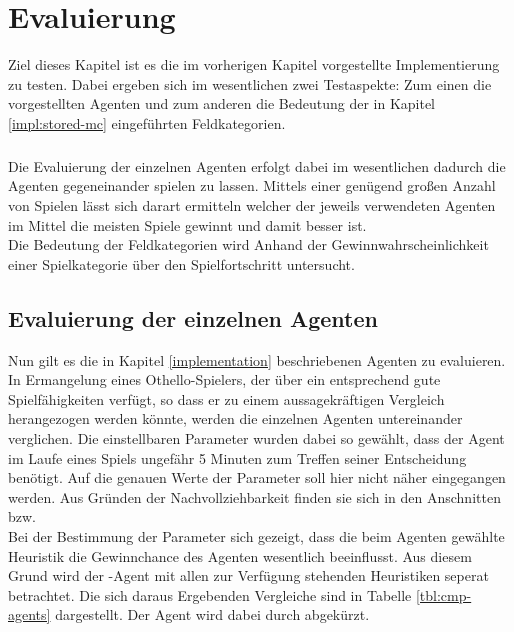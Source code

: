 \chapter{Evaluierung}
Ziel dieses Kapitel ist es die im vorherigen Kapitel vorgestellte Implementierung zu testen. Dabei ergeben sich im wesentlichen zwei Testaspekte: Zum einen die vorgestellten Agenten und zum anderen die Bedeutung der in Kapitel \ref{impl:stored-mc} eingeführten Feldkategorien.
\paragraph{}
Die Evaluierung der einzelnen Agenten erfolgt dabei im wesentlichen dadurch die Agenten gegeneinander spielen zu lassen. Mittels einer genügend großen Anzahl von Spielen lässt sich darart ermitteln welcher der jeweils verwendeten Agenten im Mittel die meisten Spiele gewinnt und damit besser ist.
\\Die Bedeutung der Feldkategorien wird Anhand der Gewinnwahrscheinlichkeit einer Spielkategorie über den Spielfortschritt untersucht.
\section{Evaluierung der einzelnen Agenten}
\label{cpt:eval-agents}
Nun gilt es die in Kapitel \ref{implementation} beschriebenen Agenten zu evaluieren. In Ermangelung eines Othello-Spielers, der über ein entsprechend gute Spielfähigkeiten verfügt, so dass er zu einem aussagekräftigen Vergleich herangezogen werden könnte, werden die einzelnen Agenten untereinander verglichen. Die einstellbaren Parameter wurden dabei so gewählt, dass der Agent im Laufe eines Spiels ungefähr 5 Minuten zum Treffen seiner Entscheidung benötigt. Auf die genauen Werte der Parameter soll hier nicht näher eingegangen werden. Aus Gründen der Nachvollziehbarkeit finden sie sich in den Anschnitten  bzw. 
\\Bei der Bestimmung der Parameter sich gezeigt, dass die beim Agenten  gewählte Heuristik die Gewinnchance des Agenten wesentlich beeinflusst. Aus diesem Grund wird der -Agent mit allen zur Verfügung stehenden Heuristiken seperat betrachtet. Die sich daraus Ergebenden Vergleiche sind in Tabelle \ref{tbl:cmp-agents} dargestellt. Der Agent  wird dabei durch  abgekürzt.
